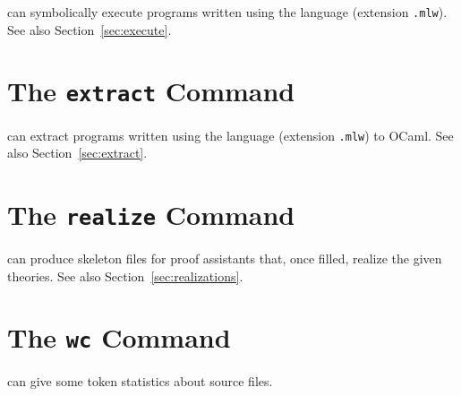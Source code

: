 \why can symbolically execute programs written using the \whyml language
(extension \texttt{.mlw}). See also Section~\ref{sec:execute}.

\section{The \texttt{extract} Command}
\label{sec:why3extract}

\why can extract programs written using the \whyml language
(extension \texttt{.mlw}) to OCaml. See also Section~\ref{sec:extract}.

\section{The \texttt{realize} Command}
\label{sec:why3realize}

\why can produce skeleton files for proof assistants that, once filled,
realize the given theories. See also Section~\ref{sec:realizations}.

\section{The \texttt{wc} Command}
\label{sec:why3wc}

\why can give some token statistics about \whyml source files.

